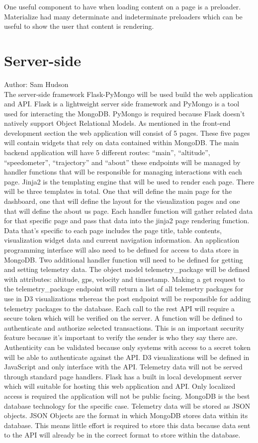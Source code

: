\documentclass[onecolumn, draftclsnofoot,10pt, compsoc]{IEEEtran}
\begin{document}
One useful component to have when loading content on a page is a preloader. Materialize had many determinate and indeterminate preloaders which can be useful to show the user that content is rendering. 
\section {Server-side}
Author: Sam Hudson \\
The server-side framework Flask-PyMongo will be used build the web application and API. Flask is a lightweight server side framework and PyMongo is a tool used for interacting the MongoDB. PyMongo is required because Flask doesn’t natively support Object Relational Models. As mentioned in the front-end development section the web application will consist of 5 pages. These five pages will contain widgets that rely on data contained within MongoDB. The main backend application will have 5 different routes: “main”, “altitude”, “speedometer”, “trajectory” and “about” these endpoints will be managed by handler functions that will be responsible for managing interactions with each page. Jinja2 is the templating engine that will be used to render each page. There will be three templates in total. One that will define the main page for the dashboard, one that will define the layout for the visualization pages and one that will define the about us page. Each handler function will gather related data for that specific page and pass that data into the jinja2 page rendering function. Data that’s specific to each page includes the page title, table contents, visualization widget data and current navigation information. An application programming interface will also need to be defined for access to data store in MongoDB. Two additional handler function will need to be defined for getting and setting telemetry data. The object model telemetry\_package will be defined with attributes: altitude, gps, velocity and timestamp. Making a get request to the telemetry\_package endpoint will return a list of all telemetry packages for use in D3 visualizations whereas the post endpoint will be responsible for adding telemetry packages to the database. Each call to the rest API will require a secure token which will be verified on the server. A function will be defined to authenticate and authorize selected transactions. This is an important security feature because it’s important to verify the sender is who they say there are. Authenticity can be validated because only systems with access to a secret token will be able to authenticate against the API. D3 visualizations will be defined in JavaScript and only interface with the API. Telemetry data will not be served through standard page handlers. Flask has a built in local development server which will suitable for hosting this web application and API. Only localized access is required the application will not be public facing. MongoDB is the best database technology for the specific case. Telemetry data will be stored as JSON objects. JSON Objects are the format in which MongoDB stores data within its database. This means little effort is required to store this data because data sent to the API will already be in the correct format to store within the database. 
\end{document}
